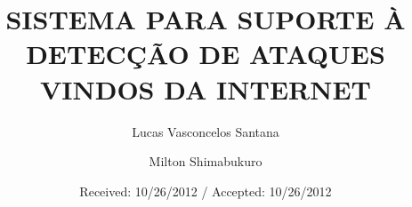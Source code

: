 \documentclass[twocolumn]{svjour3}
\begin{document}
\title{SISTEMA PARA SUPORTE À DETECÇÃO DE ATAQUES VINDOS DA INTERNET}


\author{Lucas Vasconcelos Santana \and Milton Shimabukuro}





\date{Received: 10/26/2012 / Accepted: 10/26/2012}
\maketitle
\end{document}
